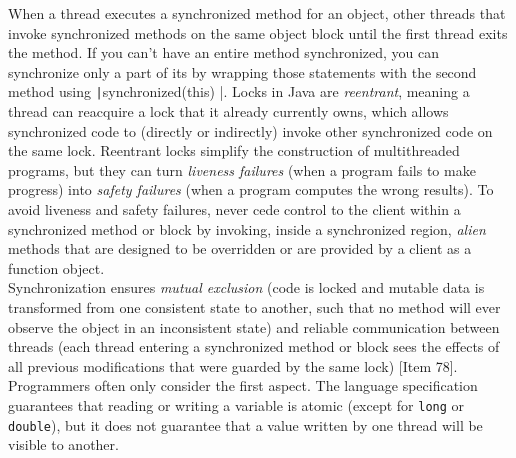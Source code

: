 \documentclass[table, xcdraw]{article}%
\begin{document}
When a thread executes a synchronized method for an object, other threads that invoke synchronized methods on the same object block until the first thread exits the method. If you can't have an entire method synchronized, you can synchronize only a part of its by wrapping those statements with the second method using \texttt|synchronized(this) { }|. Locks in Java are \emph{reentrant}, meaning a thread can reacquire a lock that it already currently owns, which allows synchronized code to (directly or indirectly) invoke other synchronized code on the same lock. Reentrant locks simplify the construction of multithreaded programs, but they can turn \emph{liveness failures} (when a program fails to make progress) into \emph{safety failures} (when a program computes the wrong results). To avoid liveness and safety failures, never cede control to the client within a synchronized method or block by invoking, inside a synchronized region, \emph{alien} methods that are designed to be overridden or are provided by a client as a function object.\\
Synchronization ensures \emph{mutual exclusion} (code is locked and mutable data is transformed from one consistent state to another, such that no method will ever observe the object in an inconsistent state) and reliable communication between threads (each thread entering a synchronized method or block sees the effects of all previous modifications that were guarded by the same lock) [Item 78]. Programmers often only consider the first aspect. The language specification guarantees that reading or writing a variable is atomic (except for \texttt{long} or \texttt{double}), but it does not guarantee that a value written by one thread will be visible to another.
\end{document}
